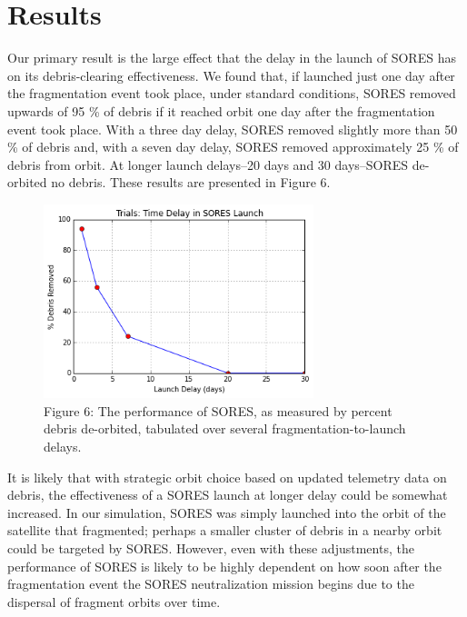 \documentclass[12pt]{scrartcl}
\begin{document}
\section{Results} \label{sec:results}

Our primary result is the large effect that the delay in the launch of SORES has on its debris-clearing effectiveness. We found that, if launched just one day after the fragmentation event took place, under standard conditions, SORES removed upwards of 95 \% of debris if it reached orbit one day after the fragmentation event took place. With a three day delay, SORES removed slightly more than 50 \% of debris and, with a seven day delay, SORES removed approximately 25 \% of debris from orbit. At longer launch delays--20 days and 30 days--SORES de-orbited no debris. These results are presented in Figure 6. 
    
\begin{figure}
\begin{center}
\label{fig:resultsvslaunchdelay}
\includegraphics[width=0.7\textwidth]{delay.png}\\
Figure 6: The performance of SORES, as measured by percent debris de-orbited, tabulated over several fragmentation-to-launch delays.
\end{center}
\end{figure}
    
It is likely that with strategic orbit choice based on updated telemetry data on debris, the effectiveness of a SORES launch at longer delay could be somewhat increased. In our simulation, SORES was simply launched into the orbit of the satellite that fragmented; perhaps a smaller cluster of debris in a nearby orbit could be targeted by SORES. However, even with these adjustments, the performance of SORES is likely to be highly dependent on how soon after the fragmentation event the SORES neutralization mission begins due to the dispersal of fragment orbits over time.
    
\end{document}
